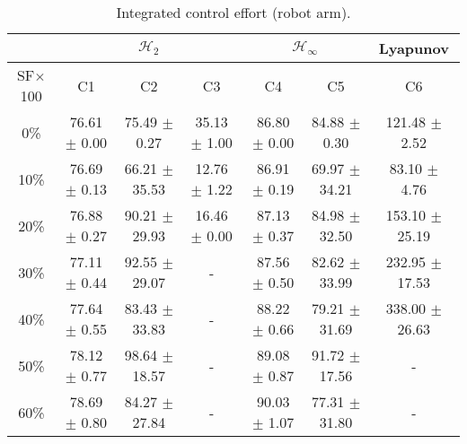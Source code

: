 \begin{table}[H]
\centering
\scriptsize
\begin{tabular}{| c || c | c | c | c | c | c |}
	\hline
	 & \multicolumn{3}{c|}{$\mathcal{H}_{2}$} & \multicolumn{2}{c|}{$\mathcal{H}_{\infty}$} & Lyapunov\\
	\hline
	SF$\times$100 & C1& C2 & C3 & C4 & C5 & C6\\
	\hline\hline
	0\% & 76.61 $\pm$ 0.00 & 75.49 $\pm$ 0.27 & 35.13 $\pm$ 1.00 & 86.80 $\pm$ 0.00 & 84.88 $\pm$ 0.30 & 121.48 $\pm$ 2.52\\
	\hline
	10\% & 76.69 $\pm$ 0.13 & 66.21 $\pm$ 35.53 & 12.76 $\pm$ 1.22 & 86.91 $\pm$ 0.19 & 69.97 $\pm$ 34.21 & 83.10 $\pm$ 4.76\\
	\hline
	20\% & 76.88 $\pm$ 0.27 & 90.21 $\pm$ 29.93 & 16.46 $\pm$ 0.00 & 87.13 $\pm$ 0.37 & 84.98 $\pm$ 32.50 & 153.10 $\pm$ 25.19\\
	\hline
	30\% & 77.11 $\pm$ 0.44 & 92.55 $\pm$ 29.07 & - & 87.56 $\pm$ 0.50 & 82.62 $\pm$ 33.99 & 232.95 $\pm$ 17.53\\
	\hline
	40\% & 77.64 $\pm$ 0.55 & 83.43 $\pm$ 33.83 & - & 88.22 $\pm$ 0.66 & 79.21 $\pm$ 31.69 & 338.00 $\pm$ 26.63\\
	\hline
	50\% & 78.12 $\pm$ 0.77 & 98.64 $\pm$ 18.57 & - & 89.08 $\pm$ 0.87 & 91.72 $\pm$ 17.56 & -\\
	\hline
	60\% & 78.69 $\pm$ 0.80 & 84.27 $\pm$ 27.84 & - & 90.03 $\pm$ 1.07 & 77.31 $\pm$ 31.80 & -\\
	\hline
\end{tabular}
\caption{Integrated control effort (robot arm).}
\label{table:control_effort_robot_arm:noise}
\end{table}

